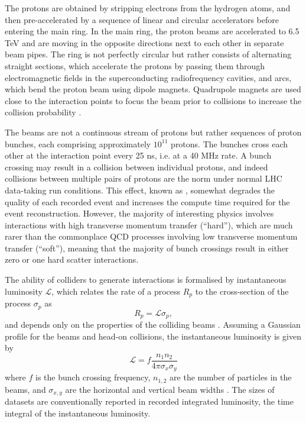 The protons are obtained by stripping electrons from the hydrogen atoms,
and then pre-accelerated by a sequence of linear and circular accelerators
before entering the main ring. In the main ring, the proton beams are
accelerated to 6.5 TeV and are moving in the opposite directions next to each other
in separate beam pipes. The ring is not perfectly circular but rather consists
of alternating straight sections, which accelerate the protons by passing
them through electromagnetic fields in the superconducting radiofrequency
cavities, and arcs, which bend the proton beam using dipole magnets.
Quadrupole magnets are used close to the interaction points to focus the
beam prior to collisions to increase the collision probability \cite{Brüning:782076}. 

The beams are not a continuous stream of protons but rather sequences of
proton bunches, each comprising approximately $10^{11}$ protons. The
bunches cross each other at the interaction point every 25 ns, i.e. at a
40 MHz rate. A bunch crossing may result in a collision between
individual protons, and indeed collisions between multiple pairs of
protons are the norm under normal LHC data-taking run conditions.
This effect, known as \pileup, somewhat degrades the quality of
each recorded event and increases the compute time required for the
event reconstruction. However, the majority of interesting physics
involves interactions with high transverse momentum transfer (``hard''),
which are much rarer than the commonplace QCD processes involving
low transverse momentum transfer (``soft''), meaning that the majority
of bunch crossings result in either zero or one hard scatter interactions.

The ability of colliders to generate interactions is formalised by
instantaneous luminosity $\mathcal{L}$, which relates the rate of a process $R_p$
to the cross-section of the process $\sigma_p$ as
\begin{equation}
R_p = \mathcal{L} \sigma_p,
\end{equation}
and depends only on the properties of the colliding beams \cite{Thomson:2013zua}. Assuming a
Gaussian profile for the beams and head-on collisions, the
instantaneous luminosity is given by
\begin{equation}
\mathcal{L} = f \frac{n_1 n_2 }{4 \pi \sigma_x \sigma_y}
\end{equation}
where $f$ is the bunch crossing frequency, $n_{1, 2}$ are the number of
particles in the beams, and $\sigma_{x,y}$ are the horizontal and vertical
beam widths \cite{Thomson:2013zua}. The sizes of datasets are conventionally
reported in recorded integrated luminosity, the time integral of the
instantaneous luminosity. 

